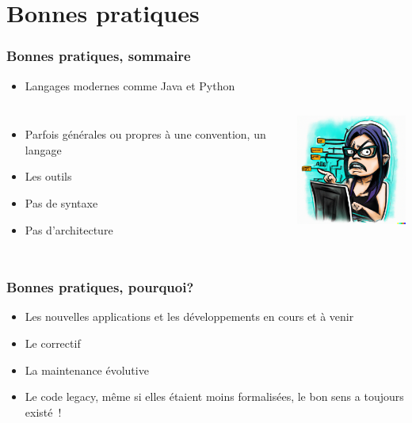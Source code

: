 \documentclass{beamer}
\begin{document}
    \section{Bonnes pratiques}

    \begin{frame}
        \transdissolve
        \frametitle{Bonnes pratiques, sommaire}
        \begin{itemize}
            \item Langages modernes comme Java et Python
        \end{itemize}
        \begin{columns}
            \begin{itemize}
                \item Parfois générales ou propres à une convention, un langage
                \item Les outils
                \item Pas de syntaxe 
                \item Pas d'architecture 
            \end{itemize}
            \centering
            \includegraphics[width=4cm]{image/maniac-programmer-sorting-her-code.png}
        \end{columns}
    \end{frame}

    \begin{frame}
        \transdissolve
        \frametitle{Bonnes pratiques, pourquoi?}
        \begin{itemize}
            \item Les nouvelles applications et les développements en cours et à venir
            \item Le correctif
            \item La maintenance évolutive
            \item Le code legacy, même si elles étaient moins formalisées, le bon sens a toujours existé~!
        \end{itemize}
    \end{frame}
\end{document}
